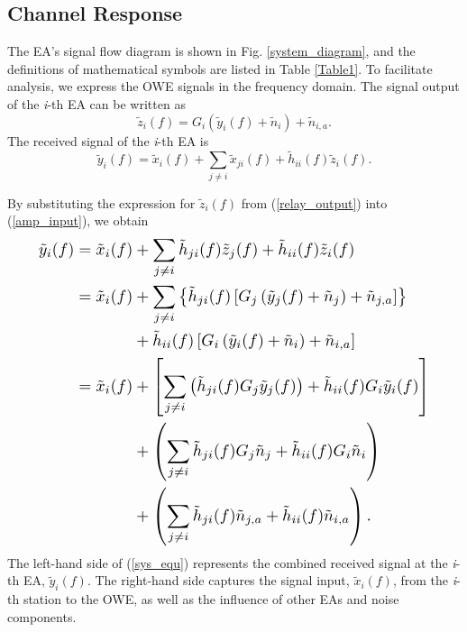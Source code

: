 \subsection{Channel Response}
\par
The EA's signal flow diagram is shown in Fig. \ref{system_diagram}, and the definitions of mathematical symbols are listed in Table \ref{Table1}. To facilitate analysis, we express the OWE signals in the frequency domain. The signal output of the \textit{i}-th EA can be written as
\begin{equation}
\label{relay_output}
{\tilde z_i}(f) = {G_i}\left( {{{\tilde y}_i}(f) + {{\tilde n}_i}} \right) + {\tilde n_{i,a}} \text{.}
\end{equation}
The received signal of the \textit{i}-th EA is
\begin{equation}
\label{amp_input}
{{\tilde y}_i}(f) = {{\tilde x}_i}(f) + \sum\limits_{j \ne i} {{{\tilde x}_{ji}}(f)}  + {{\tilde h}_{ii}}(f){{\tilde z}_i}(f) \text{.}
\end{equation}
\par
By substituting the expression for ${\tilde z_i}(f)$ from (\ref{relay_output}) into (\ref{amp_input}), we obtain 
\begin{equation}
\label{sys_equ}
\resizebox{.9\hsize}{!}{$
\begin{aligned}
{{\tilde y}_i}(f) 
= {{\tilde x}_i}(f) &+ \sum\limits_{j \ne i} {{{\tilde h}_{ji}}(f){{\tilde z}_j}(f)}  + {{\tilde h}_{ii}}(f){{\tilde z}_i}(f)\\
= {{\tilde x}_i}(f) &+ \sum\limits_{j \ne i} {\left\{ {{{\tilde h}_{ji}}(f)\left[ {{G_j}\left( {{{\tilde y}_j}(f) + {{\tilde n}_j}} \right) + {{\tilde n}_{j,a}}} \right]} \right\}} \\
&+ {{\tilde h}_{ii}}(f)\left[ {{G_i}\left( {{{\tilde y}_i}(f) + {{\tilde n}_i}} \right) + {{\tilde n}_{i,a}}} \right]\\
={{\tilde x}_i}(f) &+ \left[ {\sum\limits_{j \ne i} {\left( {{{\tilde h}_{ji}}(f){G_j}{{\tilde y}_j}(f)} \right)}  + {{\tilde h}_{ii}}(f){G_i}{{\tilde y}_i}(f)} \right] \\
&+ \left( {\sum\limits_{j \ne i} {{{\tilde h}_{ji}}(f){G_j}{{\tilde n}_j}}  + {{\tilde h}_{ii}}(f){G_i}{{\tilde n}_i}} \right) \\ 
&+ \left( {\sum\limits_{j \ne i} {{{\tilde h}_{ji}}(f){{\tilde n}_{j,a}}}  + {{\tilde h}_{ii}}(f){{\tilde n}_{i,a}}} \right) \text{.}
\end{aligned}
$}
\end{equation}
The left-hand side of (\ref{sys_equ}) represents the combined received signal at the \textit{i}-th EA, ${\tilde y}_i(f)$. The right-hand side captures the signal input, $\tilde{x}_i(f)$, from the \textit{i}-th station to the OWE, as well as the influence of other EAs and noise components.


